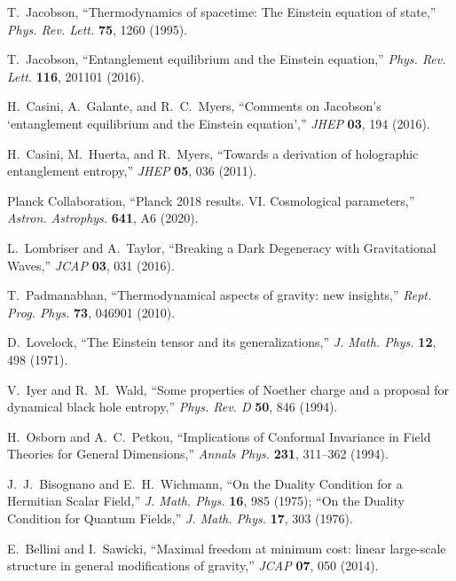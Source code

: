 \documentclass[aps,prd,onecolumn,superscriptaddress,nofootinbib]{revtex4-2}
\begin{document}

\begin{thebibliography}{99}

T.~Jacobson, ``Thermodynamics of spacetime: The Einstein equation of state,'' \emph{Phys. Rev. Lett.} \textbf{75}, 1260 (1995).

T.~Jacobson, ``Entanglement equilibrium and the Einstein equation,'' \emph{Phys. Rev. Lett.} \textbf{116}, 201101 (2016).

H.~Casini, A.~Galante, and R.~C.~Myers, ``Comments on Jacobson’s ‘entanglement equilibrium and the Einstein equation’,'' \emph{JHEP} \textbf{03}, 194 (2016).

H.~Casini, M.~Huerta, and R.~Myers, ``Towards a derivation of holographic entanglement entropy,'' \emph{JHEP} \textbf{05}, 036 (2011).

Planck Collaboration, ``Planck 2018 results. VI. Cosmological parameters,'' \emph{Astron. Astrophys.} \textbf{641}, A6 (2020).

L.~Lombriser and A.~Taylor, ``Breaking a Dark Degeneracy with Gravitational Waves,'' \emph{JCAP} \textbf{03}, 031 (2016).

T.~Padmanabhan, ``Thermodynamical aspects of gravity: new insights,'' \emph{Rept. Prog. Phys.} \textbf{73}, 046901 (2010).

D.~Lovelock, ``The Einstein tensor and its generalizations,'' \emph{J. Math. Phys.} \textbf{12}, 498 (1971).

V.~Iyer and R.~M.~Wald, ``Some properties of Noether charge and a proposal for dynamical black hole entropy,'' \emph{Phys. Rev. D} \textbf{50}, 846 (1994).

H.~Osborn and A.~C.~Petkou, ``Implications of Conformal Invariance in Field Theories for General Dimensions,'' \emph{Annals Phys.} \textbf{231}, 311--362 (1994).

J.~J.~Bisognano and E.~H.~Wichmann, ``On the Duality Condition for a Hermitian Scalar Field,'' \emph{J. Math. Phys.} \textbf{16}, 985 (1975); ``On the Duality Condition for Quantum Fields,'' \emph{J. Math. Phys.} \textbf{17}, 303 (1976).

E.~Bellini and I.~Sawicki, ``Maximal freedom at minimum cost: linear large-scale structure in general modifications of gravity,'' \emph{JCAP} \textbf{07}, 050 (2014).

\end{thebibliography}
\end{document}
